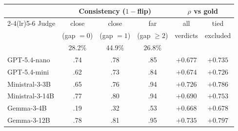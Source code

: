 \begin{tabular}{lccccc}
  \toprule
  & \multicolumn{3}{c}{Consistency ($1-$flip)} & \multicolumn{2}{c}{$\rho$ vs gold} \\
  \cmidrule(lr){2-4}\cmidrule(lr){5-6}
  Judge & close & close & far & all & tied \\
  & (gap $=0$) & (gap $=1$) & (gap $\geq 2$) & verdicts & excluded \\
  & 28.2\% & 44.9\% & 26.8\% & & \\
  \midrule
  GPT-5.4-nano     & .74 & .78 & .85 & $+0.677$ & $+0.735$ \\
  GPT-5.4-mini     & .62 & .73 & .84 & $+0.674$ & $+0.726$ \\
  Ministral-3-3B   & .65 & .76 & .94 & $+0.726$ & $+0.786$ \\
  Ministral-3-14B  & .77 & .80 & .94 & $+0.690$ & $+0.753$ \\
  Gemma-3-4B       & .19 & .32 & .53 & $+0.668$ & $+0.678$ \\
  Gemma-3-12B      & .78 & .81 & .95 & $+0.735$ & $+0.797$ \\
  \bottomrule
\end{tabular}
